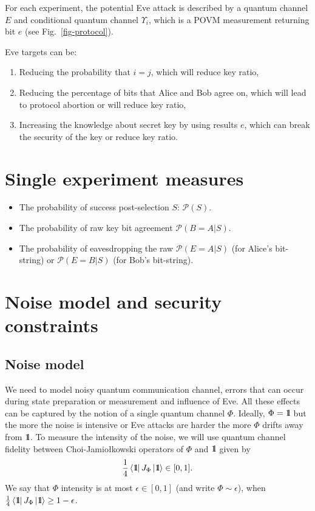 \documentclass[12pt,a4paper,reqno, aps, superscriptaddress]{amsart}
\newcommand{\Id}{{\rm 1\hspace{-0.9mm}l}}
\newcommand{\PP}{\ensuremath{\mathcal{P}}}
\begin{document}
For each experiment, the potential Eve attack is described 
by a quantum channel $E$ and conditional quantum channel $\Upsilon_{i}$, which 
is a POVM measurement returning bit $e$ (see 
Fig.~\ref{fig-protocol}).

Eve targets can be:
\begin{enumerate}
    \item Reducing the probability that $i=j$, which will reduce key ratio,
    \item Reducing the percentage of bits that Alice and Bob agree on, which 
    will lead to protocol abortion or will reduce key ratio,
    \item Increasing the knowledge about secret key by using results $e$, which 
    can break the security of the key or reduce key ratio.
\end{enumerate}

\section{Single experiment measures}
\begin{itemize}
    \item The probability of success post-selection $S$: $\PP(S)$.
    \item The probability of raw key bit agreement $\PP(B=A|S)$.
    \item The probability of eavesdropping the raw $\PP(E=A|S)$ (for Alice's 
    bit-string) or $\PP(E=B|S)$ (for Bob's bit-string).
\end{itemize}

\section{Noise model and security constraints}
\subsection{Noise model}
We need to model noisy quantum communication channel, errors that can occur 
during state preparation or measurement and influence of Eve. All these effects 
can be captured by the notion of a single quantum channel $\Phi$. Ideally, 
$\Phi=\Id$ but the more the noise is intensive or Eve attacks are harder the 
more
$\Phi$ drifts away from $\Id$. To measure the intensity of the noise, we 
will 
use quantum channel fidelity between Choi-Jamio{\l}kowski operators of $\Phi$ 
and $\Id$ given by 
\begin{equation}
\frac14 \bra{\Id} J_\Phi \ket{\Id} \in [0,1].
\end{equation}
We say that $\Phi$ intensity is at most $\epsilon \in [0,1]$ (and write $\Phi 
\sim \epsilon$), when $\frac14 
\bra{\Id} J_\Phi \ket{\Id} \ge 1-\epsilon$.
\end{document}
